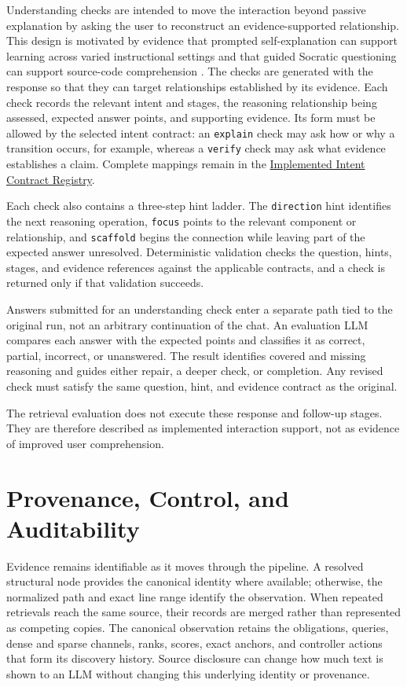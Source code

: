 Understanding checks are intended to move the interaction beyond passive explanation by asking the user to reconstruct an evidence-supported relationship. This design is motivated by evidence that prompted self-explanation can support learning across varied instructional settings \cite{Bisra2018SelfExplanation} and that guided Socratic questioning can support source-code comprehension \cite{Tamang2021Socratic}. The checks are generated with the response so that they can target relationships established by its evidence. Each check records the relevant intent and stages, the reasoning relationship being assessed, expected answer points, and supporting evidence. Its form must be allowed by the selected intent contract: an \texttt{explain} check may ask how or why a transition occurs, for example, whereas a \texttt{verify} check may ask what evidence establishes a claim. Complete mappings remain in the \hyperref[ch:implemented-intent-contract-registry]{Implemented Intent Contract Registry}.

Each check also contains a three-step hint ladder. The \texttt{direction} hint identifies the next reasoning operation, \texttt{focus} points to the relevant component or relationship, and \texttt{scaffold} begins the connection while leaving part of the expected answer unresolved. Deterministic validation checks the question, hints, stages, and evidence references against the applicable contracts, and a check is returned only if that validation succeeds.

Answers submitted for an understanding check enter a separate path tied to the original run, not an arbitrary continuation of the chat. An evaluation LLM compares each answer with the expected points and classifies it as correct, partial, incorrect, or unanswered. The result identifies covered and missing reasoning and guides either repair, a deeper check, or completion. Any revised check must satisfy the same question, hint, and evidence contract as the original.

The retrieval evaluation does not execute these response and follow-up stages. They are therefore described as implemented interaction support, not as evidence of improved user comprehension.

\section{Provenance, Control, and Auditability}\label{sec:provenance-control-and-auditability}

Evidence remains identifiable as it moves through the pipeline. A resolved structural node provides the canonical identity where available; otherwise, the normalized path and exact line range identify the observation. When repeated retrievals reach the same source, their records are merged rather than represented as competing copies. The canonical observation retains the obligations, queries, dense and sparse channels, ranks, scores, exact anchors, and controller actions that form its discovery history. Source disclosure can change how much text is shown to an LLM without changing this underlying identity or provenance.

